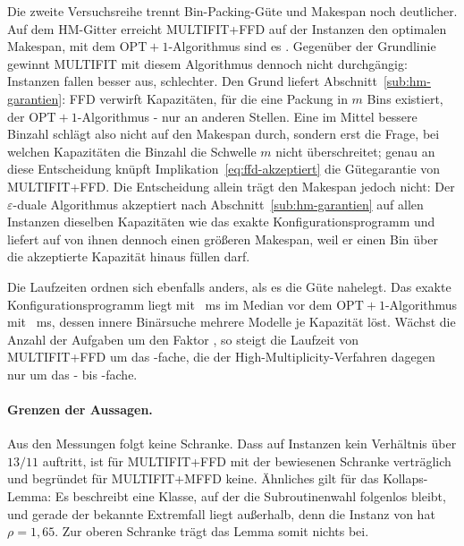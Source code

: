 Die zweite Versuchsreihe trennt Bin-Packing-Güte und Makespan noch deutlicher.
Auf dem HM-Gitter erreicht MULTIFIT+FFD auf \HmOptimalffd{} der Instanzen den optimalen
Makespan, mit dem $\mathrm{OPT}+1$-Algorithmus sind es \HmOptimaljansen.
Gegenüber der Grundlinie gewinnt MULTIFIT mit diesem Algorithmus dennoch nicht durchgängig:
\HmJansenBesserFFD{} Instanzen fallen besser aus, \HmJansenSchlechterFFD{} schlechter.
Den Grund liefert Abschnitt~\ref{sub:hm-garantien}: FFD verwirft \HmZuUnrechtFfd{} Kapazitäten,
für die eine Packung in $m$ Bins existiert, der $\mathrm{OPT}+1$-Algorithmus \HmZuUnrechtJansen{}
- nur an anderen Stellen.
Eine im Mittel bessere Binzahl schlägt also nicht auf den Makespan durch, sondern erst die
Frage, bei welchen Kapazitäten die Binzahl die Schwelle $m$ nicht überschreitet; genau an diese
Entscheidung knüpft Implikation~\eqref{eq:ffd-akzeptiert} die Gütegarantie von MULTIFIT+FFD.
Die Entscheidung allein trägt den Makespan jedoch nicht: Der $\varepsilon$-duale Algorithmus
akzeptiert nach Abschnitt~\ref{sub:hm-garantien} auf allen \HmEpsAkzeptanzInstanzen{} Instanzen
dieselben Kapazitäten wie das exakte Konfigurationsprogramm und liefert auf
\HmEpsSchlechterRef{} von ihnen dennoch einen größeren Makespan, weil er einen Bin über die
akzeptierte Kapazität hinaus füllen darf.

Die Laufzeiten ordnen sich ebenfalls anders, als es die Güte nahelegt.
Das exakte Konfigurationsprogramm liegt mit \HmZeitMedianggip{}~ms im Median vor dem
$\mathrm{OPT}+1$-Algorithmus mit \HmZeitMedianjansen{}~ms, dessen innere Binärsuche mehrere
Modelle je Kapazität löst.
Wächst die Anzahl der Aufgaben um den Faktor \HmSkalNFaktor, so steigt die Laufzeit von
MULTIFIT+FFD um das \HmSkalFaktorffd-fache, die der High-Multiplicity-Verfahren dagegen nur um
das \HmSkalFaktorMin- bis \HmSkalFaktorMax-fache.

\paragraph{Grenzen der Aussagen.}
Aus den Messungen folgt keine Schranke.
Dass auf \EvalInstanzen{} Instanzen kein Verhältnis über $13/11$ auftritt, ist für
MULTIFIT+FFD mit der bewiesenen Schranke verträglich und begründet für MULTIFIT+MFFD keine.
Ähnliches gilt für das Kollaps-Lemma: Es beschreibt eine Klasse, auf der die Subroutinenwahl
folgenlos bleibt, und gerade der bekannte Extremfall liegt außerhalb, denn die Instanz von
\textcite{friesen1984} hat $\rho = 1{,}65$.
Zur oberen Schranke trägt das Lemma somit nichts bei.

